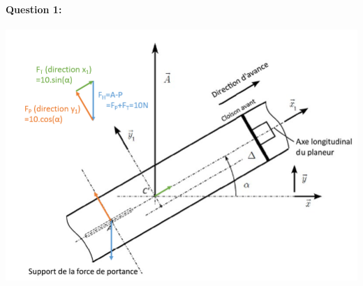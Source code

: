 %
%
%
%
%
%
%

\ifdef{\public}{}{}

\newpage

\pagestyle{correction}\setcounter{section}{0}

\paragraph{Question 1:}

\begin{center}
	\includegraphics[width=0.8\linewidth]{img/Cor1}
\end{center}

